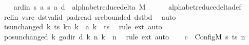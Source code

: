 \begin{isabellebody}
\ \ \isamarkupfalse%
\ ard{\isacharunderscore}{\kern0pt}in{\isacharcolon}{\kern0pt}\ {\isachardoublequoteopen}{\isacharparenleft}{\kern0pt}{\isacharquery}{\kern0pt}s{\isacharcomma}{\kern0pt}\ {\isacharquery}{\kern0pt}a{\isacharcomma}{\kern0pt}\ {\isacharquery}{\kern0pt}s{\isacharprime}{\kern0pt}{\isacharcomma}{\kern0pt}\ {\isacharquery}{\kern0pt}a{\isacharcomma}{\kern0pt}\ {\isacharquery}{\kern0pt}d{\isacharparenright}{\kern0pt}\ {\isasymin}\ alphabet{\isacharunderscore}{\kern0pt}reduce{\isacharunderscore}{\kern0pt}delta\ M{\isachardoublequoteclose}\isanewline
\ \ \ \ \isamarkupfalse%
\ alphabet{\isacharunderscore}{\kern0pt}reduce{\isacharunderscore}{\kern0pt}delta{\isacharunderscore}{\kern0pt}def\isanewline
\ \ \ \ \isamarkupfalse%
\ rel{\isacharunderscore}{\kern0pt}in\ vsrc\ dst{\isacharunderscore}{\kern0pt}valid\ pad{\isacharunderscore}{\kern0pt}read\ src{\isacharunderscore}{\kern0pt}bounded\ dst{\isacharunderscore}{\kern0pt}bd\ \isamarkupfalse%
\ auto\isanewline
\ \ \isamarkupfalse%
\ ts{\isacharunderscore}{\kern0pt}unchanged{\isacharcolon}{\kern0pt}\ {\isachardoublequoteopen}{\isacharparenleft}{\kern0pt}{\isasymlambda}k{\isachardot}{\kern0pt}\ {\isacharparenleft}{\kern0pt}ts\ k{\isacharparenright}{\kern0pt}{\isacharparenleft}{\kern0pt}n\ k\ {\isacharcolon}{\kern0pt}{\isacharequal}{\kern0pt}\ {\isacharquery}{\kern0pt}a\ k{\isacharparenright}{\kern0pt}{\isacharparenright}{\kern0pt}\ {\isacharequal}{\kern0pt}\ ts{\isachardoublequoteclose}\ \isamarkupfalse%
\ {\isacharparenleft}{\kern0pt}rule\ ext{\isacharparenright}{\kern0pt}\ auto\isanewline
\ \ \isamarkupfalse%
\ pos{\isacharunderscore}{\kern0pt}unchanged{\isacharcolon}{\kern0pt}\ {\isachardoublequoteopen}{\isacharparenleft}{\kern0pt}{\isasymlambda}k{\isachardot}{\kern0pt}\ go{\isacharunderscore}{\kern0pt}dir\ {\isacharparenleft}{\kern0pt}{\isacharquery}{\kern0pt}d\ k{\isacharparenright}{\kern0pt}\ {\isacharparenleft}{\kern0pt}n\ k{\isacharparenright}{\kern0pt}{\isacharparenright}{\kern0pt}\ {\isacharequal}{\kern0pt}\ n{\isachardoublequoteclose}\ \isamarkupfalse%
\ {\isacharparenleft}{\kern0pt}rule\ ext{\isacharparenright}{\kern0pt}\ auto\isanewline
\ \ \isamarkupfalse%
\ {\isacharquery}{\kern0pt}c{\isacharprime}{\kern0pt}{\isacharprime}{\kern0pt}\ {\isacharequal}{\kern0pt}\ {\isachardoublequoteopen}Config\isactrlsub M\ {\isacharquery}{\kern0pt}s{\isacharprime}{\kern0pt}\ ts\ n{\isachardoublequoteclose}\isanewline
\ \ \isamarkupfalse%

\end{isabellebody}
